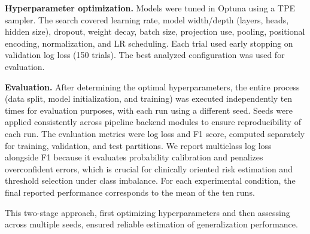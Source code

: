\documentclass{article}
\begin{document}
{%


\textbf{Hyperparameter optimization.} Models were tuned in Optuna using a TPE sampler. The search covered learning rate, model width/depth (layers, heads, hidden size), dropout, weight decay, batch size, projection use, pooling, positional encoding, normalization, and LR scheduling. Each trial used early stopping on validation log loss (150 trials). The best analyzed configuration was used for evaluation.

 
 \textbf{Evaluation.} After determining the optimal hyperparameters, the entire process (data split, model initialization, and training) was executed independently ten times for evaluation purposes, with each run using a different seed. Seeds were applied consistently across pipeline backend modules to ensure reproducibility of each run. The evaluation metrics were log loss and F1 score, computed separately for training, validation, and test partitions. We report multiclass log loss alongside F1 because it evaluates probability calibration and penalizes overconfident errors, which is crucial for clinically oriented risk estimation and threshold selection under class imbalance. For each experimental condition, the final reported performance corresponds to the mean of the ten runs.

This two-stage approach, first optimizing hyperparameters and then assessing across multiple seeds, ensured reliable estimation of generalization performance.


}
\end{document}
